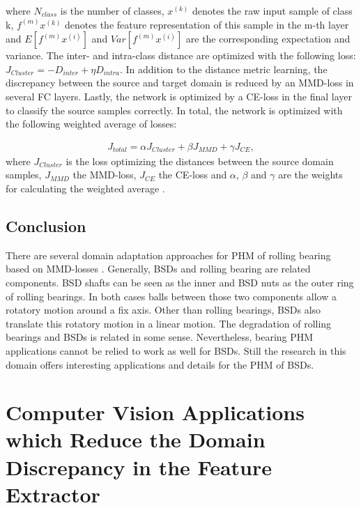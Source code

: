 where $N_{class}$ is the number of classes, $x^{(k)}$ denotes the raw input sample of class k, $f^{(m)}x^{(k)}$ denotes the feature representation of this sample in the m-th layer and $E[f^{(m)}x^{(i)}]$ and $Var[f^{(m)}x^{(i)}]$ are the corresponding expectation and variance. The inter- and intra-class distance are optimized with the following loss: $J_{Cluster} = - D_{inter} + \eta D_{intra}$. In addition to the distance metric learning, the discrepancy between the source and target domain is reduced by an MMD-loss in several FC layers. Lastly, the network is optimized by a CE-loss in the final layer to classify the source samples correctly. In total, the network is optimized with the following weighted average of losses: 

\begin{equation}
    \begin{aligned}
    J_{total} = \alpha J_{Cluster} + \beta J_{MMD} + \gamma J_{CE}, 
    \end{aligned}
\end{equation}
where $J_{Cluster}$ is the loss optimizing the distances between the source domain samples, $J_{MMD}$ the MMD-loss,  $J_{CE}$ the CE-loss and $\alpha$, $\beta$ and $\gamma$ are the weights for calculating the weighted average \cite{Li2018}.

\subsection{Conclusion}
There are several domain adaptation approaches for PHM of rolling bearing based on MMD-losses \cite{AN201942} \cite{Li2018} \cite{Guo2019} \cite{Singh2019} \cite{Kang2020}. Generally, BSDs and rolling bearing are related components. BSD shafts can be seen as the inner and BSD nuts as the outer ring of rolling bearings. In both cases balls between those two components allow a rotatory motion around a fix axis. Other than rolling bearings, BSDs also translate this rotatory motion in a linear motion. The degradation of rolling bearings and BSDs is related in some sense. Nevertheless, bearing PHM applications cannot be relied to work as well for BSDs. Still the research in this domain offers interesting applications and details for the PHM of BSDs. 

\section{Computer Vision Applications which Reduce the Domain Discrepancy in the Feature Extractor}

